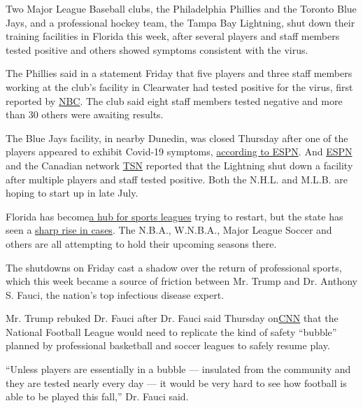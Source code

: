 Two Major League Baseball clubs, the Philadelphia Phillies and the
Toronto Blue Jays, and a professional hockey team, the Tampa Bay
Lightning, shut down their training facilities in Florida this week,
after several players and staff members tested positive and others
showed symptoms consistent with the virus.

The Phillies said in a statement Friday that five players and three
staff members working at the club's facility in Clearwater had tested
positive for the virus, first reported by
\href{https://www.nbcsports.com/philadelphia/phillies/phillies-coronavirus-outbreak-clearwater-players-staff}{NBC}.
The club said eight staff members tested negative and more than 30
others were awaiting results.

The Blue Jays facility, in nearby Dunedin, was closed Thursday after one
of the players appeared to exhibit Covid-19 symptoms,
\href{https://twitter.com/JeffPassan/status/1274042733154492418}{according
to ESPN}. And
\href{https://www.espn.com/nhl/story/_/id/29334802/source-lightning-close-facility-due-coronavirus-outbreak}{ESPN}
and the Canadian network
\href{https://www.tsn.ca/tampa-bay-lightning-temporarily-close-training-facilities-due-to-covid-19-1.1487646}{TSN}
reported that the Lightning shut down a facility after multiple players
and staff tested positive. Both the N.H.L. and M.L.B. are hoping to
start up in late July.

Florida has
become\href{https://www.nytimes.com/2020/06/18/sports/basketball/nba-disney-world-mls.html}{a
hub for sports leagues} trying to restart, but the state has seen a
\href{https://www.nytimes.com/2020/06/18/sports/basketball/nba-disney-world-mls.html}{sharp
rise in cases}. The N.B.A., W.N.B.A., Major League Soccer and others are
all attempting to hold their upcoming seasons there.

The shutdowns on Friday cast a shadow over the return of professional
sports, which this week became a source of friction between Mr. Trump
and Dr. Anthony S. Fauci, the nation's top infectious disease expert.

Mr. Trump rebuked Dr. Fauci after Dr. Fauci said Thursday
on\href{https://www.cnn.com/2020/06/18/us/football-happen-fauci-spt-trnd/index.html}{CNN}
that the National Football League would need to replicate the kind of
safety ``bubble'' planned by professional basketball and soccer leagues
to safely resume play.

``Unless players are essentially in a bubble --- insulated from the
community and they are tested nearly every day --- it would be very hard
to see how football is able to be played this fall,'' Dr. Fauci said.

